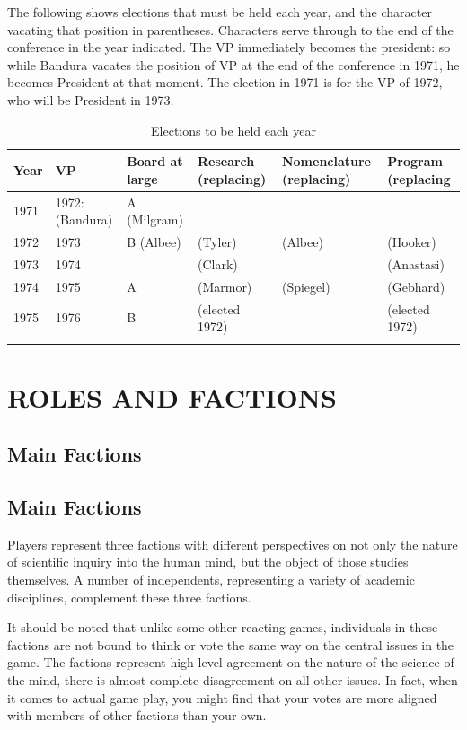 The following shows elections that must be held each year, and the character vacating that position in parentheses. Characters serve through to the end of the conference in the year indicated. The VP immediately becomes the president: so while Bandura vacates the position of VP at the end of the conference in 1971, he becomes President at that moment. The election in 1971 is for the VP of 1972, who will be President in 1973.
 \begin{longtable}[!t]{ | p{1cm} | p{2cm} | p{2cm} | p{2cm} | p{2cm} |  p{2cm} | }
\hline
\textbf{Year}&\textbf{VP}&\textbf{Board at large}&\textbf{Research (replacing)}&\textbf{Nomenclature (replacing)}&\textbf{Program (replacing} \\ \hline

1971& 1972: (Bandura)&A (Milgram)& & & \\
1972&1973&B (Albee)&(Tyler)&(Albee)&(Hooker) \\
1973&1974& &(Clark)& &(Anastasi)\\
1974&1975&A&(Marmor)&(Spiegel)&(Gebhard) \\
1975&1976&B&(elected 1972)& &(elected 1972) \\
\caption{Elections to be held each year}
\label{table: boardMembership}
\end{longtable}

\pagebreak 

\chapter{ROLES AND FACTIONS}
\label{rolesandfactions}

\section{Main Factions}
\label{mainfactions}

\section{Main Factions}
\label{mainfactions}

Players represent three factions with different perspectives on not only the nature of scientific inquiry into the human mind, but the object of those studies themselves. A number of independents, representing a variety of academic disciplines, complement these three factions.

It should be noted that unlike some other reacting games, individuals in these factions are not bound to think or vote the same way on the central issues in the game. The factions represent high-level agreement on the nature of the science of the mind, there is almost complete disagreement on all other issues. In fact, when it comes to actual game play, you might find that your votes are more aligned with members of other factions than your own.

